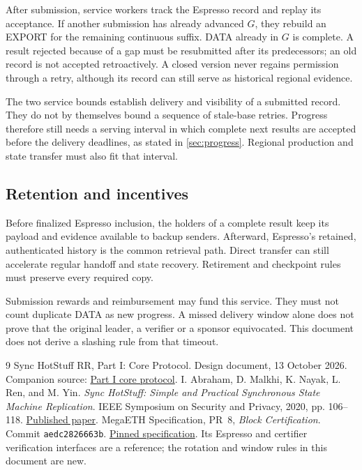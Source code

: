 \documentclass[11pt,a4paper]{article}
\newcounter{protocol}
\begin{document}
After submission, service workers track the Espresso record and replay
its acceptance. If another submission has already advanced $G$, they
rebuild an EXPORT for the remaining continuous suffix. DATA already in
$G$ is complete. A result rejected because of a gap must be resubmitted
after its predecessors; an old record is not accepted retroactively.
A closed version never regains permission through a retry, although its
record can still serve as historical regional evidence.

The two service bounds establish delivery and visibility of a submitted
record. They do not by themselves bound a sequence of stale-base retries.
Progress therefore still needs a serving interval in which complete next
results are accepted before the delivery deadlines, as stated in
\cref{sec:progress}. Regional production and state transfer must also fit
that interval.

\subsection{Retention and incentives}
Before finalized Espresso inclusion, the holders of a complete result
keep its payload and evidence available to backup senders. Afterward,
Espresso's retained, authenticated history is the common retrieval path.
Direct transfer can still accelerate regular handoff and state recovery.
Retirement and checkpoint rules must preserve every required copy.

Submission rewards and reimbursement may fund this service. They must not
count duplicate DATA as new progress. A missed delivery window alone does
not prove that the original leader, a verifier or a sponsor equivocated.
This document does not derive a slashing rule from that timeout.

\begingroup\small
\begin{thebibliography}{9}
Sync HotStuff RR, Part I: Core Protocol. Design document, 13 October 2026.
Companion source: \href{run:sync_hotstuff_rr_part1_core.tex}{Part I core protocol}.
I. Abraham, D. Malkhi, K. Nayak, L. Ren, and M. Yin.
\emph{Sync HotStuff: Simple and Practical Synchronous State Machine Replication}.
IEEE Symposium on Security and Privacy, 2020, pp. 106--118.
\href{https://conferences.computer.org/sp/pdfs/sp/2020/349700a106.pdf}{Published paper}.
MegaETH Specification, PR~8, \emph{Block Certification}.
Commit \texttt{aedc2826663b}.
\href{https://github.com/megaeth-labs/specification/tree/aedc2826663b134ee25d26bea17e70c6d23d321c/specs/block-certification}{Pinned specification}.
Its Espresso and certifier verification interfaces are a reference;
the rotation and window rules in this document are new.
\end{thebibliography}
\endgroup
\end{document}
